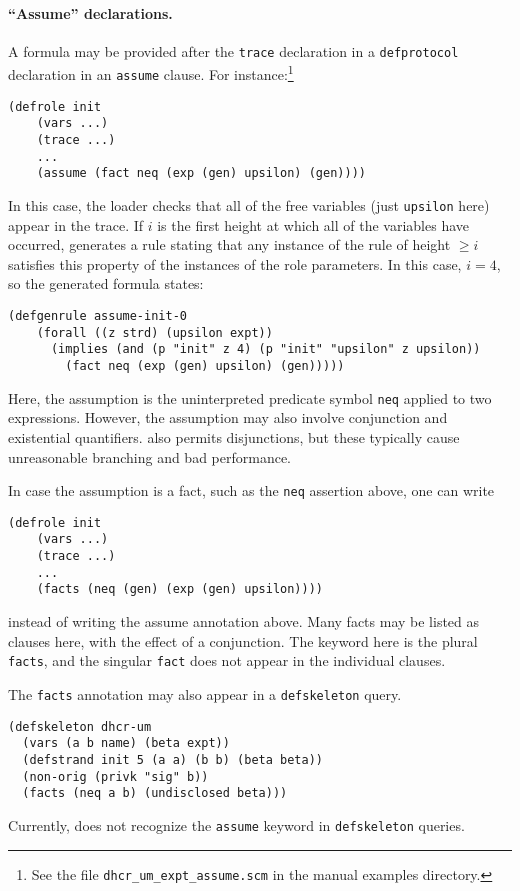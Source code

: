 \paragraph{``Assume'' declarations.}
%
%
A formula may be provided after the \verb|trace| declaration in a
\verb|defprotocol| declaration in an \verb|assume| clause.  For
instance:\footnote{See the file \texttt{dhcr\_um\_expt\_assume.scm} in
  the manual examples directory.}
%
\begin{verbatim}(defrole init
    (vars ...)
    (trace ...)
    ...
    (assume (fact neq (exp (gen) upsilon) (gen))))
\end{verbatim}
%
In this case, the {\cpsa} loader checks that all of the free variables
(just \verb|upsilon| here) appear in the trace.  If $i$ is the first
height at which all of the variables have occurred, {\cpsa} generates
a rule stating that any instance of the rule of height $\ge i$
satisfies this property of the instances of the role parameters.  In
this case, $i=4$, so the generated formula states:
%
\begin{verbatim}(defgenrule assume-init-0
    (forall ((z strd) (upsilon expt))
      (implies (and (p "init" z 4) (p "init" "upsilon" z upsilon))
        (fact neq (exp (gen) upsilon) (gen)))))
\end{verbatim}
%
Here, the assumption is the uninterpreted predicate symbol \verb|neq|
applied to two expressions.  However, the assumption may also involve
conjunction and existential quantifiers.  {\cpsa} also permits
disjunctions, but these typically cause unreasonable branching and bad
performance.

In case the assumption is a fact, such as the \verb|neq| assertion
above, one can write
%
\begin{verbatim}(defrole init
    (vars ...)
    (trace ...)
    ...
    (facts (neq (gen) (exp (gen) upsilon))))
\end{verbatim}
%
instead of writing the assume annotation above.  Many facts may be
listed as clauses here, with the effect of a conjunction.  The keyword
here is the plural \verb|facts|, and the singular \verb|fact| does not
appear in the individual clauses.

The \verb|facts| annotation may also appear in a \verb|defskeleton|
query.
%
\begin{verbatim}(defskeleton dhcr-um
  (vars (a b name) (beta expt))
  (defstrand init 5 (a a) (b b) (beta beta))
  (non-orig (privk "sig" b))
  (facts (neq a b) (undisclosed beta)))
\end{verbatim}
%
Currently, {\cpsa} does not recognize the \verb|assume| keyword in
\verb|defskeleton| queries.

